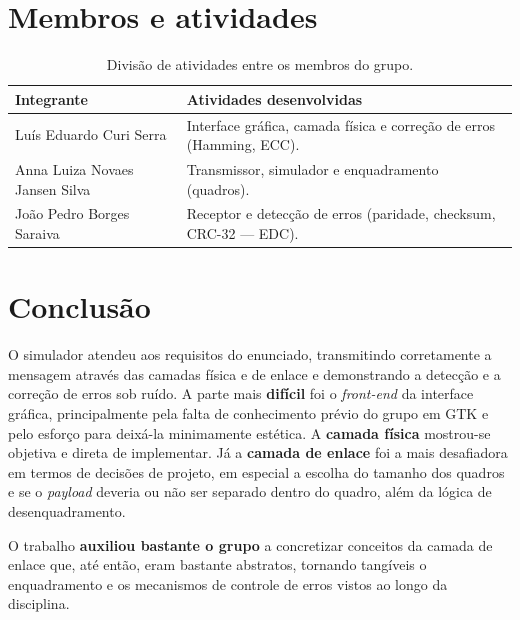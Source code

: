 \documentclass[a4paper, 11pt]{article}
\begin{document}
\section{Membros e atividades}

\begin{table}[H]
\centering
\small
\begin{tabular}{@{}ll@{}}
\toprule
\textbf{Integrante} & \textbf{Atividades desenvolvidas} \\
\midrule
Luís Eduardo Curi Serra & Interface gráfica, camada física e correção de erros (Hamming, ECC). \\
Anna Luiza Novaes Jansen Silva & Transmissor, simulador e enquadramento (quadros). \\
João Pedro Borges Saraiva & Receptor e detecção de erros (paridade, checksum, CRC-32 --- EDC). \\
\bottomrule
\end{tabular}
\caption{Divisão de atividades entre os membros do grupo.}
\label{tab:membros}
\end{table}

\section{Conclusão}

O simulador atendeu aos requisitos do enunciado, transmitindo corretamente a mensagem através
das camadas física e de enlace e demonstrando a detecção e a correção de erros sob ruído. A
parte mais \textbf{difícil} foi o \emph{front-end} da interface gráfica, principalmente pela
falta de conhecimento prévio do grupo em GTK e pelo esforço para deixá-la minimamente estética.
A \textbf{camada física} mostrou-se objetiva e direta de implementar. Já a \textbf{camada de
enlace} foi a mais desafiadora em termos de decisões de projeto, em especial a escolha do
tamanho dos quadros e se o \emph{payload} deveria ou não ser separado dentro do quadro, além
da lógica de desenquadramento.

O trabalho \textbf{auxiliou bastante o grupo} a concretizar conceitos da
camada de enlace que, até então, eram bastante abstratos, tornando tangíveis o enquadramento e
os mecanismos de controle de erros vistos ao longo da disciplina.



\end{document}

